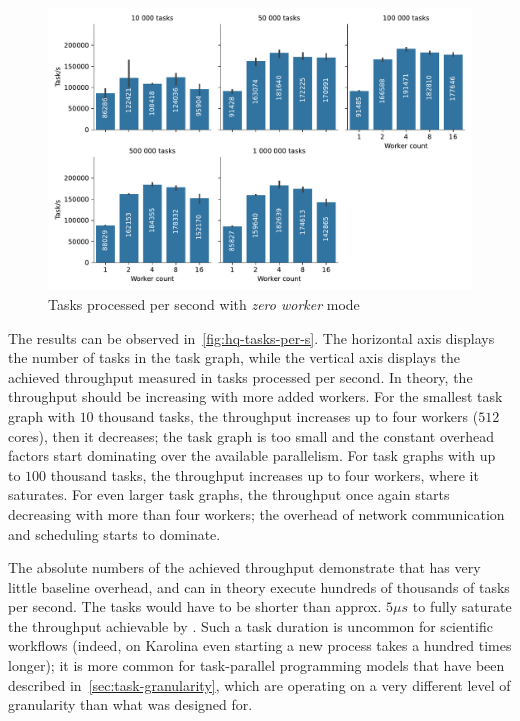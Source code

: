 \begin{figure}[h]
	\centering
	\includegraphics[width=\textwidth]{imgs/hq/charts/task-per-s}
	\caption{Tasks processed per second with \emph{zero worker} mode}
	\label{fig:hq-tasks-per-s}
\end{figure}

The results can be observed in~\autoref{fig:hq-tasks-per-s}. The horizontal axis displays the number of
tasks in the task graph, while the vertical axis displays the achieved throughput measured in tasks
processed per second. In theory, the throughput should be increasing with more added workers. For
the smallest task graph with $10$ thousand tasks, the throughput increases up to
four workers ($512$ cores), then it decreases; the task graph is too small and the
constant overhead factors start dominating over the available parallelism. For task graphs with up
to $100$ thousand tasks, the throughput increases up to four workers, where it
saturates. For even larger task graphs, the throughput once again starts decreasing with more than
four workers; the overhead of network communication and scheduling starts to dominate.

The absolute numbers of the achieved throughput demonstrate that \hyperqueue{} has very
little baseline overhead, and can in theory execute hundreds of thousands of tasks per second. The
tasks would have to be shorter than approx. $5\mu{}s$ to fully saturate the throughput
achievable by \hyperqueue{}. Such a task duration is uncommon for scientific workflows
(indeed, on Karolina even starting a new process takes a hundred times longer); it is more common
for task-parallel programming models that have been described in~\autoref{sec:task-granularity}, which are
operating on a very different level of granularity than what \hyperqueue{} was designed
for.

